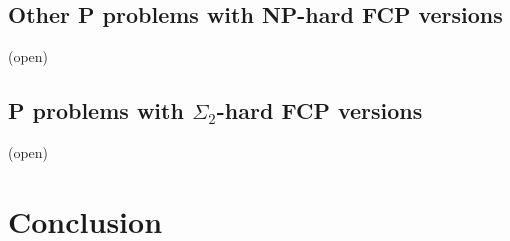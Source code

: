 \documentclass[runningheads,a4paper]{llncs}
\begin{document}
\subsection{Other P problems with NP-hard FCP versions}

(open)

\subsection{P problems with $\Sigma_2$-hard FCP versions}

(open)

\section{Conclusion}
\label{sec:conclusion}




\end{document}
